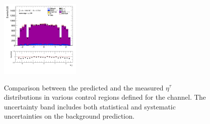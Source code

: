 \begin{figure}[!htp]
\begin{center}
			\includegraphics[width=0.35\textwidth]{chapters/chapter6_HPlus/images/taulep/tau_0_eta_SS_TAUMU.png} \\
			\end{center}
			\caption{
			Comparison between the predicted and the measured $\eta^{\tau}$ distributions in various control regions defined for the \taulep channel. The uncertainty band includes both statistical and systematic uncertainties on the background prediction. 
			}
			\label{fig:bkg-eta-tau-taulep}
		\end{figure}

